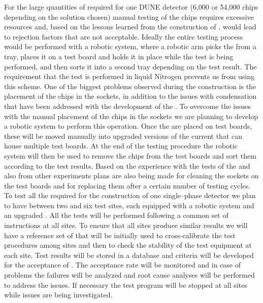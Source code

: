 For the large quantities of
 required for one DUNE  detector
(6,000 or 54,000 chips depending on the  solution
chosen) manual testing of the chips requires excessive 
resources and, based on the lessons learned from the 
construction of , would lead to rejection
factors that are not acceptable. Ideally the entire testing
process would be performed with a robotic system, where 
a robotic arm picks the  from a tray, places
it on a test board and holds it in place while the test
is being performed, and then sorts it into a second tray
depending on the test result. The requirement that the test
is performed in liquid Nitrogen prevents us from using this
scheme. One of the biggest problems observed during the
 construction is the placement of the chips in
the sockets, in addition to the issues with condensation
that have been addressed with the development of the .
To overcome the issues with the manual placement of the chips in
the sockets we are planning to develop a robotic system
to perform this operation. Once the  are 
placed on test boards, these will be moved manually into 
upgraded versions of the current  that can
house multiple test boards. At the end of the testing
procedure the robotic system will then be used to remove
the chips from the test boards and sort them according to
the test results. Based on the experience with the tests of
the   and also from other experiments
plans are also being made for cleaning the sockets on the 
test boards and for replacing them after a certain number of
testing cycles. To test all the  required for
the construction of one single--phase detector we plan to
have between two and six test sites, each equipped with a
robotic system and an upgraded . All the tests
will be performed following a common set of instructions
at all sites. To ensure that all sites produce similar
results we will have a reference set of 
that will be initially used to cross-calibrate the 
test procedures among sites and then to check the 
stability of the test equipment at each site. Test results will
be stored in a database and criteria will be developed
for the acceptance of . The acceptance rate 
will be monitored and in case of problems
the failures will be analyzed and root cause analyses
will be performed to address the issues. If necessary
the test program will be stopped at all sites while 
issues are being investigated.

